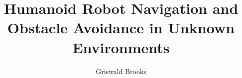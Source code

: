 \documentclass[letterpaper,12pt]{report}
\begin{document}
\title{Humanoid Robot Navigation and Obstacle Avoidance in Unknown Environments}
\author{Griswald Brooks}
\maketitle

% 

\tableofcontents
\listoffigures

% 
% 
% 
% 
% 
% 


\end{document}
